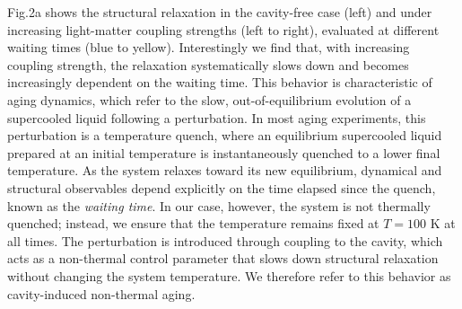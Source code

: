 \documentclass[aps, prl,
 reprint,
 superscriptaddress,
 citeautoscript,  %
 amsmath,amssymb,
 tightenlines
]{revtex4-2}
\begin{document}
Fig.2a shows the structural relaxation in the cavity-free case (left) and under increasing light-matter coupling strengths (left to right), evaluated at different waiting times (blue to yellow). Interestingly we find that, with increasing coupling strength, the relaxation systematically slows down and becomes increasingly dependent on the waiting time. This behavior is characteristic of aging dynamics, which refer to the slow, out-of-equilibrium evolution of a supercooled liquid following a perturbation. In most aging experiments, this perturbation is a temperature quench, where an equilibrium supercooled liquid prepared at an initial temperature is instantaneously quenched to a lower final temperature. As the system relaxes toward its new equilibrium, dynamical and structural observables depend explicitly on the time elapsed since the quench, known as the \emph{waiting time}. In our case, however, the system is not thermally quenched; instead, we ensure that the temperature remains fixed at $T = 100$ K at all times. The perturbation is introduced through coupling to the cavity, which acts as a non-thermal control parameter that slows down structural relaxation without changing the system temperature. We therefore refer to this behavior as cavity-induced non-thermal aging.
\end{document}

